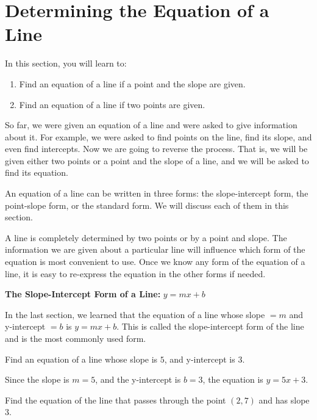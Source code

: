 \section{Determining the Equation of a Line}

In this section, you will learn to:
\begin{enumerate}
    \item Find an equation of a line if a point and the slope are given.
    \item Find an equation of a line if two points are given.
\end{enumerate}

So far, we were given an equation of a line and were asked to give information about it. For example, we were asked to find points on the line, find its slope, and even find intercepts. Now we are going to reverse the process. That is, we will be given either two points or a point and the slope of a line, and we will be asked to find its equation.

An equation of a line can be written in three forms: the slope-intercept form, the point-slope form, or the standard form. We will discuss each of them in this section.

A line is completely determined by two points or by a point and slope. The information we are given about a particular line will influence which form of the equation is most convenient to use. Once we know any form of the equation of a line, it is easy to re-express the equation in the other forms if needed.

\textbf{The Slope-Intercept Form of a Line:} $y = mx + b$

In the last section, we learned that the equation of a line whose slope $= m$ and y-intercept $= b$ is $y = mx + b$. This is called the slope-intercept form of the line and is the most commonly used form.

\begin{example}
Find an equation of a line whose slope is $5$, and y-intercept is $3$.
\end{example}

\begin{solution}
Since the slope is $m = 5$, and the y-intercept is $b = 3$, the equation is $y = 5x + 3$.
\end{solution}

\begin{example}
Find the equation of the line that passes through the point $(2, 7)$ and has slope $3$.
\end{example}

